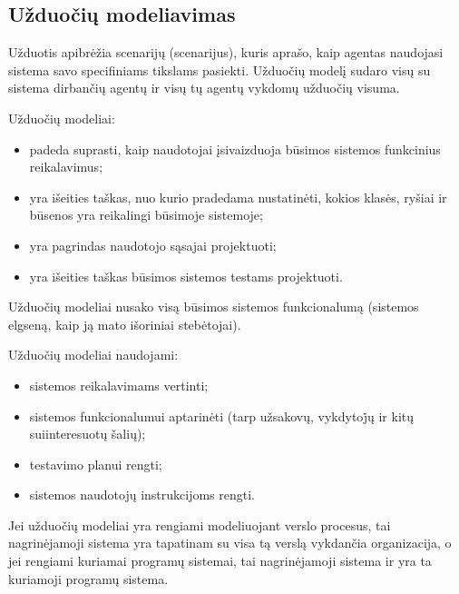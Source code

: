 \subsection{Užduočių modeliavimas}


Užduotis  apibrėžia scenarijų (\gls{scenarijus}), kuris 
aprašo, kaip \gls{agentas} naudojasi sistema savo specifiniams tikslams 
pasiekti. Užduočių modelį sudaro visų su sistema dirbančių agentų
ir visų tų agentų vykdomų užduočių visuma.

Užduočių modeliai:
\begin{itemize}
  \item padeda suprasti, kaip naudotojai įsivaizduoja būsimos sistemos
    funkcinius reikalavimus;
  \item yra išeities taškas, nuo kurio pradedama nustatinėti, kokios
    klasės, ryšiai ir būsenos yra reikalingi būsimoje sistemoje;
  \item yra pagrindas naudotojo sąsajai projektuoti;
  \item yra išeities taškas būsimos sistemos testams projektuoti.
\end{itemize}

Užduočių modeliai nusako visą būsimos sistemos funkcionalumą (sistemos
elgseną, kaip ją mato išoriniai stebėtojai).

Užduočių modeliai naudojami:
\begin{itemize}
  \item sistemos reikalavimams vertinti;
  \item sistemos funkcionalumui aptarinėti (tarp užsakovų, vykdytoj̇ų ir
    kitų suiinteresuotų šalių);
  \item testavimo planui rengti;
  \item sistemos naudotojų instrukcijoms rengti.
\end{itemize}

Jei užduočių modeliai yra rengiami modeliuojant verslo procesus, tai
nagrinėjamoji sistema yra tapatinam su visa tą verslą vykdančia
organizacija, o jei rengiami kuriamai programų sistemai, tai nagrinėjamoji
sistema ir yra ta kuriamoji programų sistema.



